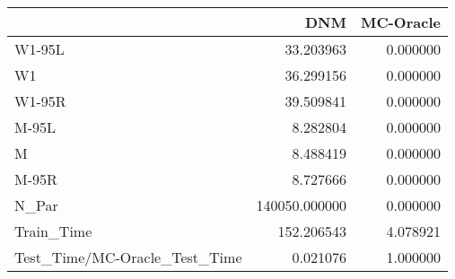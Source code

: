 \begin{tabular}{lrr}
\toprule
{} &            DNM &  MC-Oracle \\
\midrule
W1-95L                        &      33.203963 &   0.000000 \\
W1                            &      36.299156 &   0.000000 \\
W1-95R                        &      39.509841 &   0.000000 \\
M-95L                         &       8.282804 &   0.000000 \\
M                             &       8.488419 &   0.000000 \\
M-95R                         &       8.727666 &   0.000000 \\
N\_Par                         &  140050.000000 &   0.000000 \\
Train\_Time                    &     152.206543 &   4.078921 \\
Test\_Time/MC-Oracle\_Test\_Time &       0.021076 &   1.000000 \\
\bottomrule
\end{tabular}
